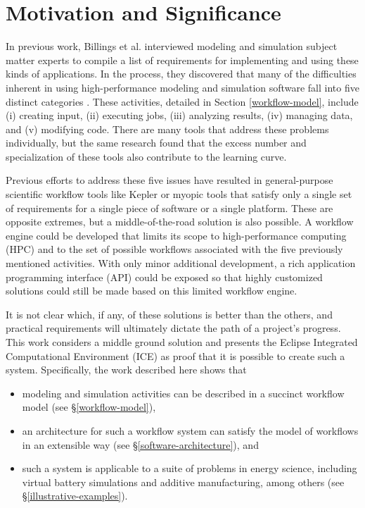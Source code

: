 \section{Motivation and Significance}\label{motivation-and-significance}

In previous work, Billings et al. interviewed modeling and simulation subject
matter experts to compile a list of requirements for implementing and using
these kinds of applications. In the process, they discovered that many of the
difficulties inherent in using high-performance modeling and simulation
software fall into five distinct categories \cite{billings_designing_2009}.
These activities, detailed in Section \ref{workflow-model}, include (i)
creating input, (ii) executing jobs, (iii) analyzing results, (iv) managing
data, and (v) modifying code. There are many tools that address these problems
individually, but the same research found that the excess number and
specialization of these tools also contribute to the learning curve.

Previous efforts to address these five issues have resulted in general-purpose
scientific workflow tools like Kepler \cite{ludascher_scientific_2006} or
myopic tools that satisfy only a single set of requirements for a single piece
of software or a single platform. These are opposite extremes, but a
middle-of-the-road solution is also possible. A workflow engine could be
developed that limits its scope to high-performance computing (HPC) and to the
set of possible workflows associated with the five previously mentioned
activities. With only minor additional development, a rich application
programming interface (API) could be exposed so that highly customized
solutions could still be made based on this limited workflow engine.

It is not clear which, if any, of these solutions is better than the
others, and practical requirements will ultimately dictate the path of a
project's progress. This work considers a middle ground solution and
presents the Eclipse Integrated Computational Environment (ICE) as proof
that it is possible to create such a system. Specifically, the work
described here shows that

\begin{itemize}
\item
  modeling and simulation activities can be described in a succinct
  workflow model (see \S \ref{workflow-model}),
\item
  an architecture for such a workflow system can satisfy the model of
  workflows in an extensible way (see \S \ref{software-architecture}), and 
\item
  such a system is applicable to a suite of problems in energy science,
  including virtual battery simulations and additive manufacturing, 
  among others (see \S \ref{illustrative-examples}).
\end{itemize}

